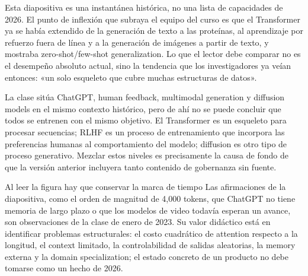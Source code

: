 
Esta diapositiva es una instantánea histórica, no una lista de capacidades de 2026. El punto de inflexión que subraya el equipo del curso es que el Transformer ya se había extendido de la generación de texto a las proteínas, al aprendizaje por refuerzo fuera de línea y a la generación de imágenes a partir de texto, y mostraba zero-shot/few-shot generalization. Lo que el lector debe comparar no es el desempeño absoluto actual, sino la tendencia que los investigadores ya veían entonces: «un solo esqueleto que cubre muchas estructuras de datos».


La clase sitúa ChatGPT, human feedback, multimodal generation y diffusion models en el mismo contexto histórico, pero de ahí no se puede concluir que todos se entrenen con el mismo objetivo. El Transformer es un esqueleto para procesar secuencias; RLHF es un proceso de entrenamiento que incorpora las preferencias humanas al comportamiento del modelo; diffusion es otro tipo de proceso generativo. Mezclar estos niveles es precisamente la causa de fondo de que la versión anterior incluyera tanto contenido de gobernanza sin fuente.


\begin{warningbox}{Al leer la figura hay que conservar la marca de tiempo}
Las afirmaciones de la diapositiva, como el orden de magnitud de 4,000 tokens, que ChatGPT no tiene memoria de largo plazo o que los modelos de video todavía esperan un avance, son observaciones de la clase de enero de 2023. Su valor didáctico está en identificar problemas estructurales: el costo cuadrático de attention respecto a la longitud, el context limitado, la controlabilidad de salidas aleatorias, la memory externa y la domain specialization; el estado concreto de un producto no debe tomarse como un hecho de 2026.
\end{warningbox}

